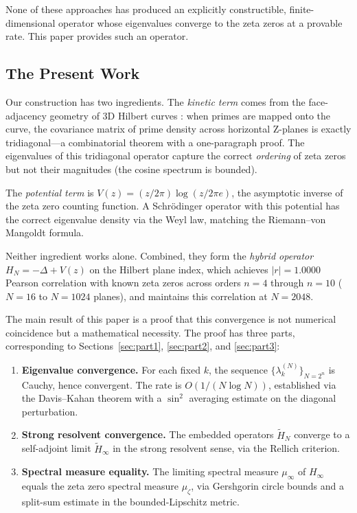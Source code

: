 \documentclass[11pt,a4paper]{article}
\theoremstyle{definition}
\begin{document}
None of these approaches has produced an explicitly constructible,
finite-dimensional operator whose eigenvalues converge to the zeta
zeros at a provable rate. This paper provides such an operator.

\subsection{The Present Work}

Our construction has two ingredients. The \emph{kinetic term} comes
from the face-adjacency geometry of 3D Hilbert curves \cite{hilbert1891}:
when primes are mapped onto the curve, the covariance matrix of prime
density across horizontal Z-planes is exactly tridiagonal---a
combinatorial theorem with a one-paragraph proof. The eigenvalues of
this tridiagonal operator capture the correct \emph{ordering} of zeta
zeros but not their magnitudes (the cosine spectrum is bounded).

The \emph{potential term} is $V(z) = (z/2\pi)\log(z/2\pi e)$, the
asymptotic inverse of the zeta zero counting function. A Schr\"{o}dinger
operator with this potential has the correct eigenvalue density via the
Weyl law, matching the Riemann--von Mangoldt formula.

Neither ingredient works alone. Combined, they form the \emph{hybrid
operator} $H_N = -\Delta + V(z)$ on the Hilbert plane index, which
achieves $|r| = 1.0000$ Pearson correlation with known zeta zeros
across orders $n = 4$ through $n = 10$ ($N = 16$ to $N = 1024$ planes),
and maintains this correlation at $N = 2048$.

The main result of this paper is a proof that this convergence is not
numerical coincidence but a mathematical necessity. The proof has
three parts, corresponding to Sections~\ref{sec:part1},
\ref{sec:part2}, and \ref{sec:part3}:

\begin{enumerate}
\item \textbf{Eigenvalue convergence.} For each fixed $k$, the sequence
  $\{\lambda_k^{(N)}\}_{N=2^n}$ is Cauchy, hence convergent. The rate
  is $O(1/(N\log N))$, established via the Davis--Kahan theorem with
  a $\sin^2$ averaging estimate on the diagonal perturbation.
\item \textbf{Strong resolvent convergence.} The embedded operators
  $\widetilde{H}_N$ converge to a self-adjoint limit
  $\widetilde{H}_\infty$ in the strong resolvent sense, via the
  Rellich criterion.
\item \textbf{Spectral measure equality.} The limiting spectral measure
  $\mu_\infty$ of $H_\infty$ equals the zeta zero spectral measure
  $\mu_\zeta$, via Gershgorin circle bounds and a split-sum estimate
  in the bounded-Lipschitz metric.
\end{enumerate}
\end{document}
